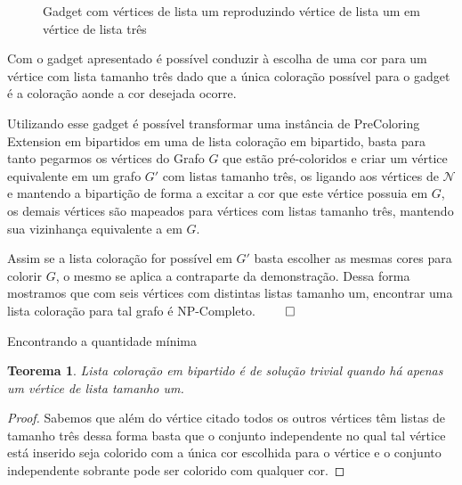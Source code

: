 \documentclass[9pt, compress]{beamer}
\newtheorem{teorema}{Teorema}
\begin{document}
    \begin{frame}
   \begin{figure}[H]
      \begin{subfigure}
        \centering
		    
      \end{subfigure}
      \begin{subfigure}
        \centering
		    
      \end{subfigure}
      \begin{subfigure}
        \centering
		    
      \end{subfigure}
      \caption{Gadget com vértices de lista um reproduzindo vértice de lista um em vértice de lista três}
      \label{fig:gadget}
  \end{figure}

      Com o gadget apresentado é possível conduzir à escolha de uma cor para um vértice com lista tamanho três dado que a única coloração possível para o gadget é a coloração aonde a cor desejada ocorre.
    \end{frame}
    \begin{frame}
      Utilizando esse gadget é possível transformar uma instância de PreColoring Extension em bipartidos em uma de lista coloração em bipartido, basta para tanto pegarmos os vértices do Grafo $G$ que estão pré-coloridos e criar um vértice equivalente em um grafo $G'$ com listas tamanho três, os ligando aos vértices de $\mathcal{N}$ e mantendo a bipartição de forma a excitar a cor que este vértice possuia em $G$, os demais vértices são mapeados para vértices com listas tamanho três, mantendo sua vizinhança equivalente a em $G$.

      Assim se a lista coloração for possível em $G'$ basta escolher as mesmas cores para colorir $G$, o mesmo se aplica a contraparte da demonstração. Dessa forma mostramos que com seis vértices com distintas listas tamanho um, encontrar uma lista coloração para tal grafo é NP-Completo. $\qed$
    \end{frame}
     \begin{frame}{Encontrando a quantidade mínima}
       \begin{teorema}
       Lista coloração em bipartido é de solução trivial quando há apenas um vértice de lista tamanho um.
       \end{teorema}
       \begin{proof}
       Sabemos que além do vértice citado todos os outros vértices têm listas de tamanho três dessa forma basta que o conjunto independente no qual tal vértice está inserido seja colorido com a única cor escolhida para o vértice e o conjunto independente sobrante pode ser colorido com qualquer cor.
       \end{proof}
       \end{frame}
\end{document}
